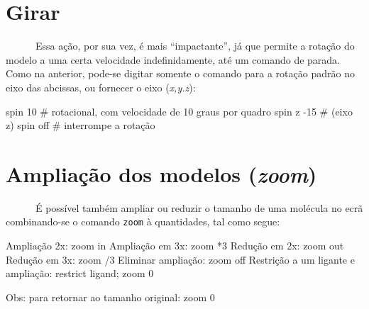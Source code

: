 \documentclass[
  letterpaper,
  DIV=11,
  numbers=noendperiod]{scrreprt}
\newenvironment{Shaded}{\begin{snugshade}}{\end{snugshade}}
\newcommand{\AttributeTok}[1]{\textcolor[rgb]{0.40,0.45,0.13}{#1}}
\newcommand{\CommentTok}[1]{\textcolor[rgb]{0.37,0.37,0.37}{#1}}
\newcommand{\ControlFlowTok}[1]{\textcolor[rgb]{0.00,0.23,0.31}{#1}}
\newcommand{\DecValTok}[1]{\textcolor[rgb]{0.68,0.00,0.00}{#1}}
\newcommand{\NormalTok}[1]{\textcolor[rgb]{0.00,0.23,0.31}{#1}}
\newcommand{\SpecialCharTok}[1]{\textcolor[rgb]{0.37,0.37,0.37}{#1}}
\newcommand{\StringTok}[1]{\textcolor[rgb]{0.13,0.47,0.30}{#1}}
\begin{document}
\section{Girar}\label{girar}

~~~~~~Essa ação, por sua vez, é mais ``impactante'', já que permite a
rotação do modelo a uma certa velocidade indefinidamente, até um comando
de parada. Como na anterior, pode-se digitar somente o comando para a
rotação padrão no eixo das abcissas, ou fornecer o eixo (\emph{x,y.z}):

\begin{Shaded}
\begin{Highlighting}[]
\NormalTok{spin }\DecValTok{10} \CommentTok{\# rotacional, com velocidade de 10 graus por quadro}
\NormalTok{spin z }\SpecialCharTok{{-}}\DecValTok{15} \CommentTok{\# (eixo z)}
\NormalTok{spin off }\CommentTok{\# interrompe a rotação}
\end{Highlighting}
\end{Shaded}

\section{\texorpdfstring{Ampliação dos modelos
(\emph{zoom})}{Ampliação dos modelos (zoom)}}\label{ampliauxe7uxe3o-dos-modelos-zoom}

~~~~~~É possível também ampliar ou reduzir o tamanho de uma molécula no
ecrã combinando-se o comando \texttt{zoom} à quantidades, tal como
segue:

\begin{Shaded}
\begin{Highlighting}[]
\NormalTok{Ampliação }\DecValTok{2}\NormalTok{x}\SpecialCharTok{:}\NormalTok{ zoom }\ControlFlowTok{in}
\NormalTok{Ampliação em }\DecValTok{3}\NormalTok{x}\SpecialCharTok{:}\NormalTok{ zoom }\SpecialCharTok{*}\DecValTok{3} 
\NormalTok{Redução em }\DecValTok{2}\NormalTok{x}\SpecialCharTok{:}\NormalTok{ zoom out }
\NormalTok{Redução em }\DecValTok{3}\NormalTok{x}\SpecialCharTok{:}\NormalTok{ zoom }\SpecialCharTok{/}\DecValTok{3} 
\NormalTok{Eliminar ampliação}\SpecialCharTok{:}\NormalTok{ zoom off }
\NormalTok{Restrição a um ligante e ampliação}\SpecialCharTok{:}\NormalTok{ restrict ligand; zoom }\DecValTok{0}

\NormalTok{Obs}\SpecialCharTok{:}\NormalTok{ para retornar ao tamanho original}\SpecialCharTok{:} \StringTok{\textasciigrave{}}\AttributeTok{zoom 0}\StringTok{\textasciigrave{}}
\end{Highlighting}
\end{Shaded}
\end{document}
